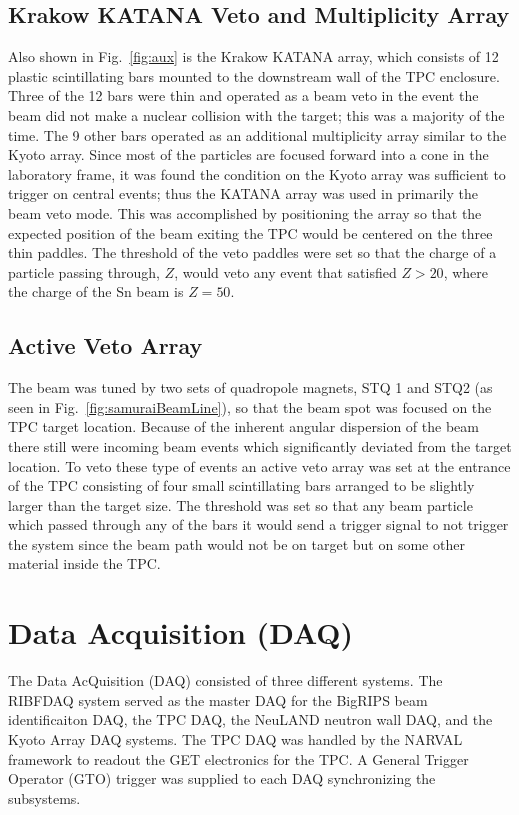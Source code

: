 \subsection{Krakow KATANA Veto and Multiplicity Array}
Also shown in Fig.~\ref{fig:aux} is the Krakow KATANA array, which consists of 12 plastic scintillating bars mounted to the downstream wall of the TPC enclosure. Three of the 12 bars were thin and operated as a beam veto in the event the beam did not make a nuclear collision with the target; this was a majority of the time. The 9 other bars operated as an additional multiplicity array similar to the Kyoto array. Since most of the particles are focused forward into a cone in the laboratory frame, it was found the condition on the Kyoto array was sufficient to trigger on central events; thus the KATANA array was used in primarily the beam veto mode. This was accomplished by positioning the array so that the expected position of the beam exiting the TPC would be centered on the three thin paddles. The threshold of the veto paddles were set so that the charge of a particle passing through, $Z$, would veto any event that satisfied $Z > 20$, where the charge of the Sn beam is $Z=50$. 


\subsection{Active Veto Array}
The beam was tuned by two sets of quadropole  magnets, STQ 1 and STQ2 (as seen in Fig.~\ref{fig:samuraiBeamLine}), so that the beam spot was focused on the TPC target location. Because of the inherent angular dispersion of the beam there still were incoming beam events which significantly deviated from the target location. To veto these type of events an active veto array was set at the entrance of the TPC consisting of four small scintillating bars arranged to be slightly larger than the target size. The threshold was set so that any beam particle which passed through any of the bars it would send a trigger signal to not trigger the system since the beam path would not be on target but on some other material inside the TPC. 


\section{Data Acquisition (DAQ) }
The Data AcQuisition (DAQ) consisted of three different systems. The RIBFDAQ system served as the master DAQ for the BigRIPS beam identificaiton DAQ, the TPC DAQ, the NeuLAND neutron wall DAQ, and the Kyoto Array DAQ systems. The TPC DAQ was handled by the NARVAL framework to readout the GET electronics for the \spirit TPC. A General Trigger Operator (GTO) trigger was supplied to each DAQ synchronizing the subsystems. 

